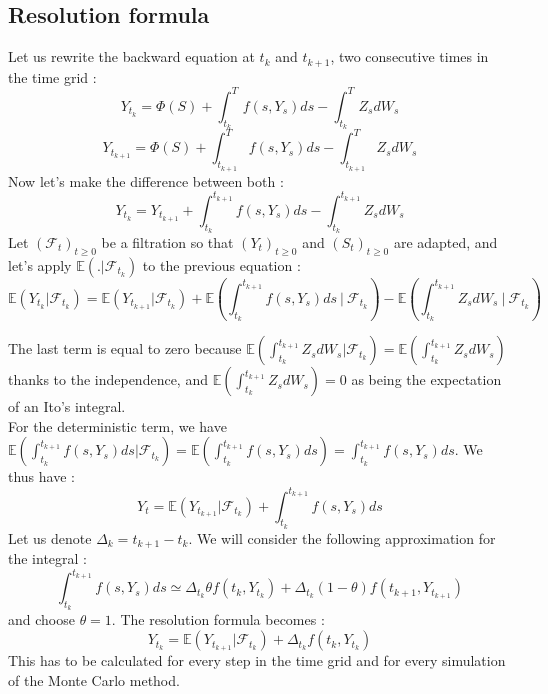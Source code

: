 \documentclass[a4paper,11pt,english]{book}
\begin{document}
\subsection{Resolution formula}
Let us rewrite the backward equation at $t_{k}$ and $t_{k+1}$, two consecutive times in the time grid :
$$Y_{t_{k}} = \Phi(S) + \int_{t_{k}}^{T} f(s,Y_{s}) ds - \int_{t_{k}}^{T} Z_{s} dW_{s}$$
$$Y_{t_{k+1}} = \Phi(S) + \int_{t_{k+1}}^{T} f(s,Y_{s}) ds - \int_{t_{k+1}}^{T} Z_{s} dW_{s}$$
Now let's make the difference between both :
\begin{equation}
    Y_{t_{k}} = Y_{t_{k+1}} + \int_{t_{k}}^{t_{k+1}} f(s,Y_{s}) ds - \int_{t_{k}}^{t_{k+1}}Z_{s} dW_{s}
    \label{eq:Y_t}
\end{equation}
Let $(\mathcal{F}_{t})_{t\geq0}$ be a filtration so that $(Y_{t})_{t\geq0}$ and $(S_{t})_{t\geq0}$ are adapted, and let's apply $\mathbb{E}(.|\mathcal{F}_{t_{k}})$ to the previous equation :
$$\mathbb{E}(Y_{t_{k}}|\mathcal{F}_{t_{k}}) = \mathbb{E}(Y_{t_{k+1}}|\mathcal{F}_{t_{k}}) + \mathbb{E}\left(\int_{t_{k}}^{t_{k+1}} f(s,Y_{s}) ds~\bigg\vert~\mathcal{F}_{t_{k}}\right) - \mathbb{E}\left(\int_{t_{k}}^{t_{k+1}}Z_{s} dW_{s}~\bigg\vert~\mathcal{F}_{t_{k}}\right)$$

The last term is equal to zero because $\mathbb{E}(\int_{t_{k}}^{t_{k+1}}Z_{s} dW_{s}|\mathcal{F}_{t_{k}})=\mathbb{E}(\int_{t_{k}}^{t_{k+1}}Z_{s} dW_{s})$ thanks to the independence, and $\mathbb{E}(\int_{t_{k}}^{t_{k+1}}Z_{s} dW_{s})=0$ as being the expectation of an Ito's integral.\\
For the deterministic term, we have $\mathbb{E}(\int_{t_{k}}^{t_{k+1}}f(s,Y_{s}) ds|\mathcal{F}_{t_{k}})=\mathbb{E}(\int_{t_{k}}^{t_{k+1}}f(s,Y_{s}) ds) = \int_{t_{k}}^{t_{k+1}}f(s,Y_{s}) ds$.
We thus have :
\begin{equation}
    Y_t = \mathbb{E}(Y_{t_{k+1}}|\mathcal{F}_{t_{k}}) + \int_{t_{k}}^{t_{k+1}}f(s,Y_{s}) ds
\end{equation}
Let us denote $\Delta_{k}=t_{k+1}-t_{k}$. We will consider the following approximation for the integral :
$$\int_{t_{k}}^{t_{k+1}}f(s,Y_{s})ds \simeq \Delta_{t_{k}}\theta f(t_{k},Y_{t_{k}}) + \Delta_{t_{k}}(1-\theta) f(t_{k+1},Y_{t_{k+1}})$$
and choose $\theta=1$. The resolution formula becomes :
\begin{equation}
Y_{t_{k}} = \mathbb{E}(Y_{t_{k+1}}|\mathcal{F}_{t_{k}}) + \Delta_{t_{k}}f(t_{k},Y_{t_{k}})
\label{resolutionFormula}
\end{equation}
This has to be calculated for every step in the time grid and for every simulation of the Monte Carlo method.
\end{document}
